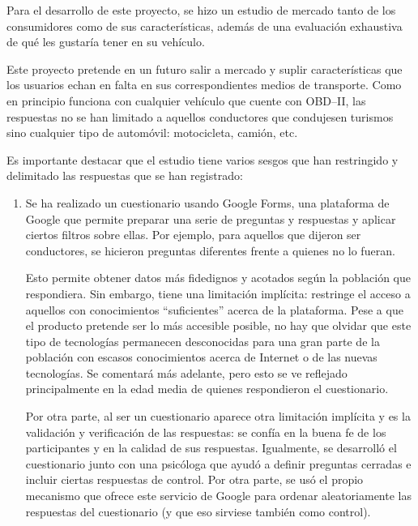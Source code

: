 Para el desarrollo de este proyecto, se hizo un estudio de mercado tanto de los
consumidores como de sus características, además de una evaluación exhaustiva
de qué les gustaría tener en su vehículo.

Este proyecto pretende en un futuro salir a mercado y suplir características que los
usuarios echan en falta en sus correspondientes medios de transporte. Como en principio
funciona con cualquier vehículo que cuente con \ac{OBD}--II, las respuestas no se han
limitado a aquellos conductores que condujesen turismos sino cualquier tipo de
automóvil: motocicleta, camión, etc.

Es importante destacar que el estudio tiene varios sesgos que han restringido
y delimitado las respuestas que se han registrado:

\begin{enumerate}
  \item Se ha realizado un cuestionario usando Google Forms, una plataforma de Google
        que permite preparar una serie de preguntas y respuestas y aplicar ciertos
        filtros sobre ellas. Por ejemplo, para aquellos que dijeron ser conductores,
        se hicieron preguntas diferentes frente a quienes no lo fueran.

        Esto permite obtener datos más fidedignos y acotados según la población que
        respondiera. Sin embargo, tiene una limitación implícita: restringe el acceso
        a aquellos con conocimientos ``suficientes'' acerca de la plataforma. Pese
        a que el producto pretende ser lo más accesible posible, no hay que olvidar
        que este tipo de tecnologías permanecen desconocidas para una gran parte
        de la población con escasos conocimientos acerca de Internet o de las
        nuevas tecnologías. Se comentará más adelante, pero esto se ve reflejado
        principalmente en la edad media de quienes respondieron el cuestionario.

        Por otra parte, al ser un cuestionario aparece otra limitación implícita
        y es la validación y verificación de las respuestas: se confía en la buena
        fe de los participantes y en la calidad de sus respuestas. Igualmente, se
        desarrolló el cuestionario junto con una psicóloga que ayudó a definir
        preguntas cerradas e incluir ciertas respuestas de control. Por otra parte,
        se usó el propio mecanismo que ofrece este servicio de Google para ordenar
        aleatoriamente las respuestas del cuestionario (y que eso sirviese también
        como control).


\end{enumerate}
